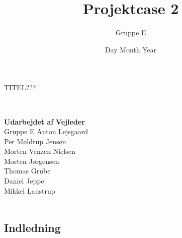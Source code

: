 \documentclass[12pt,a4paper]{report}
\title{Projektcase 2}
\author{Gruppe E}
\date{Day Month Year} %
\begin{document}
\pagestyle{empty}
\maketitle
\centering
\begin{huge}
TITEL???
\end{huge}\\
\vspace*{3\baselineskip}
\raggedright {\textbf{Udarbejdet af}} \hfill {\textbf{Vejleder}\\
Gruppe E \hfill Anton Lejsgaard\\
Per Møldrup Jensen\\
Morten Venzen Nielsen\\
Morten Jørgensen\\
Thomas Grube\\
Daniel Jeppe\\
Mikkel Laustrup}\\
\vfill
{}\\
\raggedright %
\newpage
\pagestyle{fancy}
\subsection{Indledning}



\end{document}
